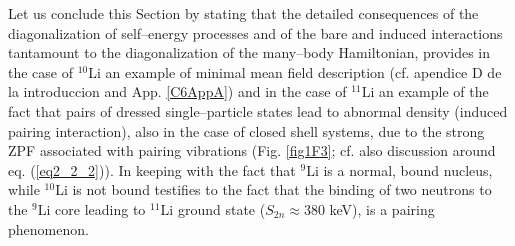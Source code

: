  
 Let us conclude this Section by stating that the detailed consequences  of the diagonalization of self--energy processes and of the bare and induced interactions  tantamount to the diagonalization of the many--body Hamiltonian, provides in the case of $^{10}$Li an example of minimal mean field description (cf. apendice D de la introduccion and App. \ref{C6AppA}) and in the case of $^{11}$Li an example of the fact that pairs of dressed single--particle states lead to abnormal density (induced pairing interaction), also in the case of closed shell systems, due to the strong ZPF associated with pairing vibrations (Fig. \ref{fig1F3}; cf. also discussion around eq. (\ref{eq2_2_2})). In keeping with the fact that $^9$Li is a normal, bound nucleus, while $^{10}$Li is not bound testifies to the fact that the binding of two neutrons to the $^9$Li core leading to $^{11}$Li ground state ($S_{2n}\approx 380$ keV), is a pairing phenomenon. 
